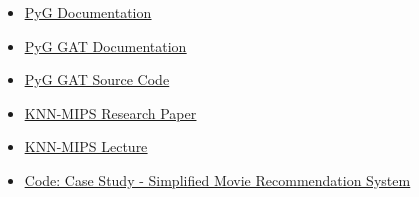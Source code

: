 \documentclass{beamer}
\begin{document}


\begin{frame}[fragile]
\begin{itemize}
\frametitle{References}
[ball]

\item \href{https://pytorch-geometric.readthedocs.io/en/latest/}{\underline{PyG Documentation}}

\vspace{0.5cm}

\item \href{https://pytorch-geometric.readthedocs.io/en/latest/generated/torch_geometric.nn.conv.GATConv.html#torch_geometric.nn.conv.GATConv}{\underline{PyG GAT Documentation}}

\vspace{0.5cm}

\item \href{https://pytorch-geometric.readthedocs.io/en/latest/_modules/torch_geometric/nn/conv/gat_conv.html#GATConv}{\underline{PyG GAT Source Code}}

\vspace{0.5cm}

\item \href{https://www.ijcai.org/Proceedings/11/Papers/222.pdf}{\underline{KNN-MIPS Research Paper}}

\vspace{0.5cm}

\item \href{https://www.cse.cuhk.edu.hk/systems/hash/gqr/report/bob-slide.pdf}{\underline{KNN-MIPS Lecture}}

\vspace{0.5cm}

\item \href{https://github.com/twallett/GNN/blob/main/code/CaseStudy/main.py}{\underline{Code: Case Study - Simplified Movie Recommendation System}}

\end{itemize}
\end{frame}

\end{document}
